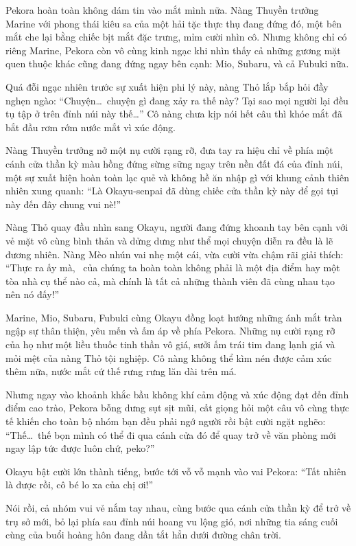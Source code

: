 \documentclass[../main.tex]{subfiles}
\begin{document}
Pekora hoàn toàn không dám tin vào mắt mình nữa. Nàng Thuyền trưởng Marine với phong thái kiêu sa của một hải tặc thực thụ đang đứng đó, một bên mắt che lại bằng chiếc bịt mắt đặc trưng, mỉm cười nhìn cô. Nhưng không chỉ có riêng Marine, Pekora còn vô cùng kinh ngạc khi nhìn thấy cả những gương mặt quen thuộc khác cũng đang đứng ngay bên cạnh: Mio, Subaru, và cả Fubuki nữa.


Quá đỗi ngạc nhiên trước sự xuất hiện phi lý này, nàng Thỏ lắp bắp hỏi đầy nghẹn ngào: ``Chuyện\dots\ chuyện gì đang xảy ra thế này? Tại sao mọi người lại đều tụ tập ở trên đỉnh núi này thế\dots'' Cô nàng chưa kịp nói hết câu thì khóe mắt đã bắt đầu rơm rớm nước mắt vì xúc động.

Nàng Thuyền trưởng nở một nụ cười rạng rỡ, đưa tay ra hiệu chỉ về phía một cánh cửa thần kỳ màu hồng đứng sừng sững ngay trên nền đất đá của đỉnh núi, một sự xuất hiện hoàn toàn lạc quẻ và không hề ăn nhập gì với khung cảnh thiên nhiên xung quanh: ``Là Okayu-senpai đã dùng chiếc cửa thần kỳ này để gọi tụi này đến đây chung vui nè!''

Nàng Thỏ quay đầu nhìn sang Okayu, người đang đứng khoanh tay bên cạnh với vẻ mặt vô cùng bình thản và dửng dưng như thể mọi chuyện diễn ra đều là lẽ đương nhiên. Nàng Mèo nhún vai nhẹ một cái, vừa cười vừa chậm rãi giải thích: ``Thực ra ấy mà, \hll\ của chúng ta hoàn toàn không phải là một địa điểm hay một tòa nhà cụ thể nào cả, mà chính là tất cả những thành viên đã cùng nhau tạo nên nó đấy!''

Marine, Mio, Subaru, Fubuki cùng Okayu đồng loạt hướng những ánh mắt tràn ngập sự thân thiện, yêu mến và ấm áp về phía Pekora. Những nụ cười rạng rỡ của họ như một liều thuốc tinh thần vô giá, sưởi ấm trái tim đang lạnh giá và mỏi mệt của nàng Thỏ tội nghiệp. Cô nàng không thể kìm nén được cảm xúc thêm nữa, nước mắt cứ thế rưng rưng lăn dài trên má.


Nhưng ngay vào khoảnh khắc bầu không khí cảm động và xúc động đạt đến đỉnh điểm cao trào, Pekora bỗng dưng sụt sịt mũi, cất giọng hỏi một câu vô cùng thực tế khiến cho toàn bộ nhóm bạn đều phải ngớ người rồi bật cười ngặt nghẽo: ``Thế\dots\ thế bọn mình có thể đi qua cánh cửa đó để quay trở về văn phòng mới ngay lập tức được luôn chứ, peko?''

Okayu bật cười lớn thành tiếng, bước tới vỗ vỗ mạnh vào vai Pekora: ``Tất nhiên là được rồi, cô bé lo xa của chị ơi!''

Nói rồi, cả nhóm vui vẻ nắm tay nhau, cùng bước qua cánh cửa thần kỳ để trở về trụ sở mới, bỏ lại phía sau đỉnh núi hoang vu lộng gió, nơi những tia sáng cuối cùng của buổi hoàng hôn đang dần tắt hẳn dưới đường chân trời.
\end{document}
